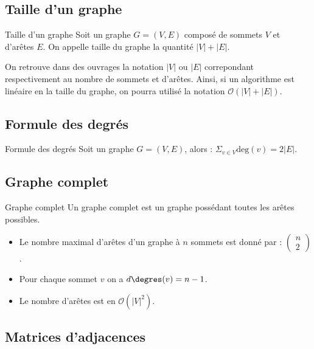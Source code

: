 \subsection{Taille d'un graphe}

\begin{defi}{Taille d'un graphe}
Soit un graphe $G=\left(V,E\right)$ composé de sommets $V$ et d'arêtes $E$. On appelle taille du graphe la quantité $|V|+|E|$.
\end{defi}

\begin{rem}
On retrouve dans des ouvrages la notation $|V|$ ou $|E|$ correpondant respectivement au nombre de sommets et d'arêtes. 
Ainsi, si un algorithme est linéaire en la taille du graphe, on pourra utilisé la notation $\mathcal{O}\left(|V|+|E|\right)$.
\end{rem}

\subsection{Formule des degrés}
\begin{defi}{Formule des degrés}
Soit un graphe $G=\left(V,E\right)$, alors : $\displaystyle{\Sigma_{v \in V}} \text{deg}(v) = 2|E|$.
\end{defi}

\subsection{Graphe complet}

\begin{defi}{Graphe complet}
Un graphe complet est un graphe possédant toutes les arêtes possibles. 
\end{defi}

\begin{rem}
\begin{itemize}
\item Le nombre maximal d'arêtes d'un graphe à $n$ sommets est donné par : $\begin{pmatrix} n \\ 2\end{pmatrix}$.
\item Pour chaque sommet $v$ on a $d\degres (v) = n-1$.
\item Le nombre d'arêtes est en $\mathcal{O}\left(|V|^2\right)$.
\end{itemize}
\end{rem}

\subsection{Matrices d'adjacences}

